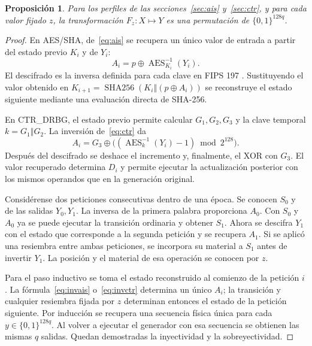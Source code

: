 \documentclass[11pt,a4paper]{article}
\newtheorem{proposicion}{Proposición}
\newcommand{\Enc}{\operatorname{AES}}
\newcommand{\HH}{\operatorname{SHA256}}
\newcommand{\bits}{\{0,1\}}
\newcommand{\cat}{\mathbin\Vert}
\begin{document}
\begin{proposicion}\label{prop:causal}
Para los perfiles de las secciones~\ref{sec:ais} y~\ref{sec:ctr}, y para cada valor fijado \(z\), la transformación \(F_z:X\mapsto Y\) es una permutación de \(\bits^{128q}\).
\end{proposicion}
\begin{proof}
En AES/SHA, de~\eqref{eq:ais} se recupera un único valor de entrada a partir del estado previo \(K_i\) y de \(Y_i\):
\begin{equation}
 A_i=p\oplus\Enc^{-1}_{K_i}(Y_i).
 \label{eq:invais}
\end{equation}
El descifrado es la inversa definida para cada clave en FIPS 197 \cite{aes}. Sustituyendo el valor obtenido en \(K_{i+1}=\HH(K_i\cat(p\oplus A_i))\) se reconstruye el estado siguiente mediante una evaluación directa de SHA-256.

En CTR\_DRBG, el estado previo permite calcular \(G_1,G_2,G_3\) y la clave temporal \(k=G_1\cat G_2\). La inversión de~\eqref{eq:ctr} da
\begin{equation}
 A_i=G_3\oplus\bigl((\Enc^{-1}_{k}(Y_i)-1)\bmod 2^{128}\bigr).
 \label{eq:invctr}
\end{equation}
Después del descifrado se deshace el incremento y, finalmente, el XOR con \(G_3\). El valor recuperado determina \(D_i\) y permite ejecutar la actualización posterior con los mismos operandos que en la generación original.

Considérense dos peticiones consecutivas dentro de una época. Se conocen \(S_0\) y de las salidas \(Y_0,Y_1\). La inversa de la primera palabra proporciona \(A_0\). Con \(S_0\) y \(A_0\) ya se puede ejecutar la transición ordinaria y obtener \(S_1\). Ahora se descifra \(Y_1\) con el estado que corresponde a la segunda petición y se recupera \(A_1\). Si se aplicó una resiembra entre ambas peticiones, se incorpora su material a \(S_1\) antes de invertir \(Y_1\). La posición y el material de esa operación se conocen por \(z\).

Para el paso inductivo se toma el estado reconstruido al comienzo de la petición \(i\). La fórmula~\eqref{eq:invais} o~\eqref{eq:invctr} determina un único \(A_i\); la transición y cualquier resiembra fijada por \(z\) determinan entonces el estado de la petición siguiente. Por inducción se recupera una secuencia física única para cada \(y\in\bits^{128q}\). Al volver a ejecutar el generador con esa secuencia se obtienen las mismas \(q\) salidas. Quedan demostradas la inyectividad y la sobreyectividad.
\end{proof}
\end{document}
